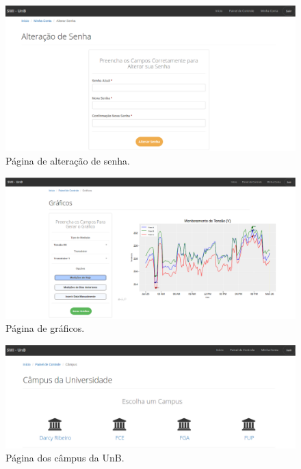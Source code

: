 \begin{anexosenv}
\begin{figure}[!htpb]
    \centering
    \includegraphics[keepaspectratio=true,scale=0.35]{figuras/img6.eps}
    \caption{Página de alteração de senha.}
    \label{img6}
\end{figure}

\begin{figure}[!htpb]
    \centering
    \includegraphics[keepaspectratio=true,scale=0.35]{figuras/img15.eps}
    \caption{Página de gráficos.}
    \label{img15}
\end{figure}

\begin{figure}[!htpb]
    \centering
    \includegraphics[keepaspectratio=true,scale=0.35]{figuras/img7.eps}
    \caption{Página dos câmpus da UnB.}
    \label{img7}
\end{figure}


\end{anexosenv}
